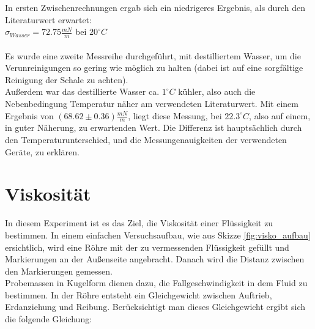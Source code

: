 \documentclass[12pt,a4paper]{article}
\begin{document}
\begin{multicols}{2}

In ersten Zwischenrechnungen ergab sich ein niedrigeres Ergebnis, als durch den Literaturwert erwartet:\\
$\sigma_{Wasser} = 72.75 \frac{mN}{m}$ bei $20^{\circ}C$\\
\\
Es wurde eine zweite Messreihe durchgeführt, mit destilliertem Wasser, um die Verunreinigungen so gering wie möglich zu halten (dabei ist auf eine sorgfältige Reinigung der Schale zu achten). \\
Außerdem war das destillierte Wasser ca. $1^{\circ}C$ kühler, also auch die Nebenbedingung Temperatur näher am verwendeten Literaturwert. Mit einem Ergebnis von $(68.62 \pm 0.36) \frac{mN}{m}$,  liegt diese Messung, bei $22.3^{\circ}C$, also auf einem, in guter Näherung, zu erwartenden Wert. Die Differenz ist hauptsächlich durch den Temperaturunterschied, und die Messungenauigkeiten der verwendeten Geräte, zu erklären. 

\section{Viskosität}
In diesem Experiment ist es das Ziel, die Viskosität einer Flüssigkeit zu bestimmen. In einem einfachen Versuchsaufbau, wie aus Skizze \ref{fig:visko_aufbau} ersichtlich, wird eine Röhre mit der zu vermessenden Flüssigkeit gefüllt und Markierungen an der Außenseite angebracht. Danach wird die Distanz zwischen den Markierungen gemessen. \\
Probemassen in Kugelform dienen dazu, die Fallgeschwindigkeit in dem Fluid zu bestimmen. In der Röhre entsteht ein Gleichgewicht zwischen Auftrieb, Erdanziehung und Reibung. Berücksichtigt man dieses Gleichgewicht ergibt sich die folgende Gleichung:


\end{multicols}
\end{document}
